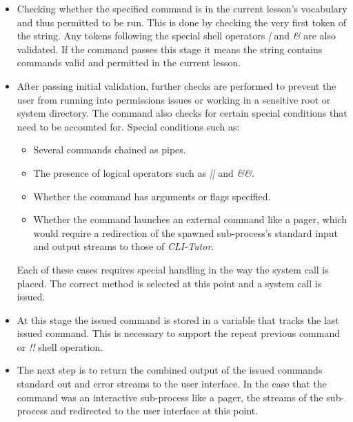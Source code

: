 \begin{itemize}

    \item Checking whether the specified command is in the current lesson's
        vocabulary and thus permitted to be run. This is done by checking the
        very first token of the string. Any tokens following the special shell
        operators \textit{|} and \textit{\&} are also validated. If the command
        passes this stage it means the string contains commands valid and
        permitted in the current lesson.


    \item After passing initial validation, further checks are performed to
        prevent the user from running into permissions issues or working in a
        sensitive root or system directory. The command also checks for
        certain special conditions that need to be accounted for. Special
        conditions such as:

        \begin{itemize}
            \item Several commands chained as pipes.
            \item The presence of logical operators such as \textit{||} and \textit{\&\&}.  
            \item Whether the command has arguments or flags specified.
            \item Whether the command launches an external command like a
                pager, which would require a redirection of the spawned
                sub-process's standard input and output streams to those of
                \textit{CLI-Tutor}.  
        \end{itemize}

        Each of these cases requires special handling in the way the system
        call is placed. The correct method is selected at this point and a
        system call is issued.

    \item At this stage the issued command is stored in a variable that tracks
        the last issued command. This is necessary to support the
        repeat previous command or \textit{!!} shell operation.

    \item The next step is to return the combined output of the issued
        commands standard out and error streams to the user interface. In the
        case that the command was an interactive sub-process like a pager, the
        streams of the sub-process and redirected to the user interface at this
        point.


\end{itemize}
